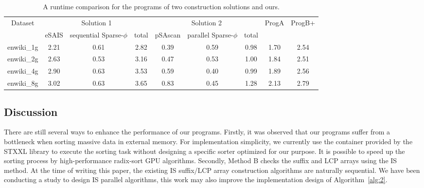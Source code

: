 \documentclass[10pt,journal,compsoc]{IEEEtran}
\begin{document}
\renewcommand\arraystretch{1.3}
\begin{table}[h]
	\caption{A runtime comparison for the programs of two construction solutions and ours.}
	\label{tbl:3}
	\centering
	\begin{tabular}{|c|c|c|c|c|c|c|c|c|}
		\hline
		\multirow{2}{*}{Dataset} & \multicolumn{3}{|c|}{Solution 1} & \multicolumn{3}{c|}{Solution 2} & \multirow{2}{*}{ProgA} & \multirow{2}{*}{ProgB+} \\\cline{2-7}
		 & eSAIS & sequential Sparse-$\phi$ & total & pSAscan & parallel Sparse-$\phi$ & total & & \\\hline
		enwiki\_1g & 2.21 & 0.61 & 2.82 & 0.39 & 0.59 & 0.98 & 1.70 & 2.54 \\\hline
		enwiki\_2g & 2.63 & 0.53 & 3.16 & 0.47 & 0.53 & 1.00 & 1.84 & 2.51 \\\hline
		enwiki\_4g & 2.90 & 0.63 & 3.53 & 0.59 & 0.40 & 0.99 & 1.89 & 2.56 \\\hline
		enwiki\_8g & 3.02 & 0.63 & 3.65 & 0.83 & 0.45 & 1.28 & 2.13 & 2.79 \\\hline
	\end{tabular}
\end{table}



\subsection{Discussion}

There are still several ways to enhance the performance of our programs. Firstly, it was observed that our programs suffer from a bottleneck when sorting massive data in external memory. For implementation simplicity, we currently use the container provided by the STXXL library to execute the sorting task without designing a specific sorter optimized for our purpose. It is possible to speed up the sorting process by high-performance radix-sort GPU algorithms. Secondly, Method B checks the suffix and LCP arrays using the IS method. At the time of writing this paper, the existing IS suffix/LCP array construction algorithms are naturally sequential. We have been conducting a study to design IS parallel algorithms, this work may also improve the implementation design of Algorithm~\ref{alg:2}. 
\end{document}
